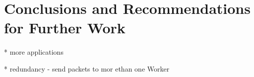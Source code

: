 \section{Conclusions and Recommendations for Further Work}
\paragraph{}

* more applications

* redundancy - send packets to mor ethan one Worker